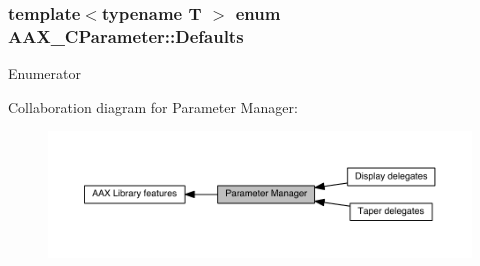 \subsubsection[{Defaults}]{\setlength{\rightskip}{0pt plus 5cm}template$<$typename T $>$ enum {\bf A\+A\+X\+\_\+\+C\+Parameter\+::\+Defaults}}\label{a00344_ga6bd5a5ddc796fa3a9de77157bf444ca8}
\begin{Desc}
\item[Enumerator]\par
\begin{description}
\item[{\em 
\hypertarget{a00344_gga6bd5a5ddc796fa3a9de77157bf444ca8a511ee79dc3b6322b2facb41b2663be30}{}e\+Parameter\+Default\+Num\+Steps\+Discrete\label{a00344_gga6bd5a5ddc796fa3a9de77157bf444ca8a511ee79dc3b6322b2facb41b2663be30}
}]\item[{\em 
\hypertarget{a00344_gga6bd5a5ddc796fa3a9de77157bf444ca8a54c0d050e5b34d4eb85c840168ec4567}{}e\+Parameter\+Default\+Num\+Steps\+Continuous\label{a00344_gga6bd5a5ddc796fa3a9de77157bf444ca8a54c0d050e5b34d4eb85c840168ec4567}
}]\end{description}
\end{Desc}
Collaboration diagram for Parameter Manager\+:
\nopagebreak
\begin{figure}[H]
\begin{center}
\leavevmode
\includegraphics[width=350pt]{a00344}
\end{center}
\end{figure}
